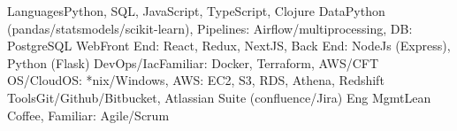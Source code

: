 \begin{additionals}
  \addional
    {Languages}{Python, SQL, JavaScript, TypeScript, Clojure}
  \addional
    {Data}{Python (pandas/statsmodels/scikit-learn), Pipelines: Airflow/multiprocessing, DB: PostgreSQL}
  \addional
      {Web}{Front End: React, Redux, NextJS, Back End: NodeJs (Express), Python (Flask)}
  \addional
    {DevOps/Iac}{Familiar: Docker, Terraform, AWS/CFT}
  \addional
    {OS/Cloud}{OS: *nix/Windows, AWS: EC2, S3, RDS, Athena, Redshift}
  \addional
    {Tools}{Git/Github/Bitbucket, Atlassian Suite (confluence/Jira)}
  \addional
    {Eng Mgmt}{Lean Coffee, Familiar: Agile/Scrum}
\end{additionals}


